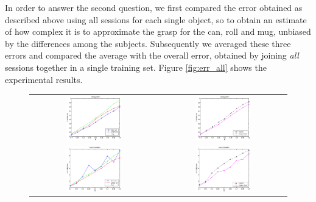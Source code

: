 In order to answer the second question, we first compared the error
obtained as described above using all sessions for each single object,
so to obtain an estimate of how complex it is to approximate the grasp
for the can, roll and mug, unbiased by the differences among the
subjects. Subsequently we averaged these three errors and compared the
average with the overall error, obtained by joining \emph{all}
sessions together in a single training set. Figure \ref{fig:err_all} 
shows the experimental results.

\begin{figure}[htbp]
  \begin{center}
    \begin{tabular}{cc}
      \includegraphics[width=0.45\textwidth]{error_pos.eps} &
      \includegraphics[width=0.45\textwidth]{error_cmp_pos.eps} \\
      \includegraphics[width=0.45\textwidth]{error_ori.eps} &
      \includegraphics[width=0.45\textwidth]{error_cmp_ori.eps} \\

\end{tabular}
\end{center}
\end{figure}
